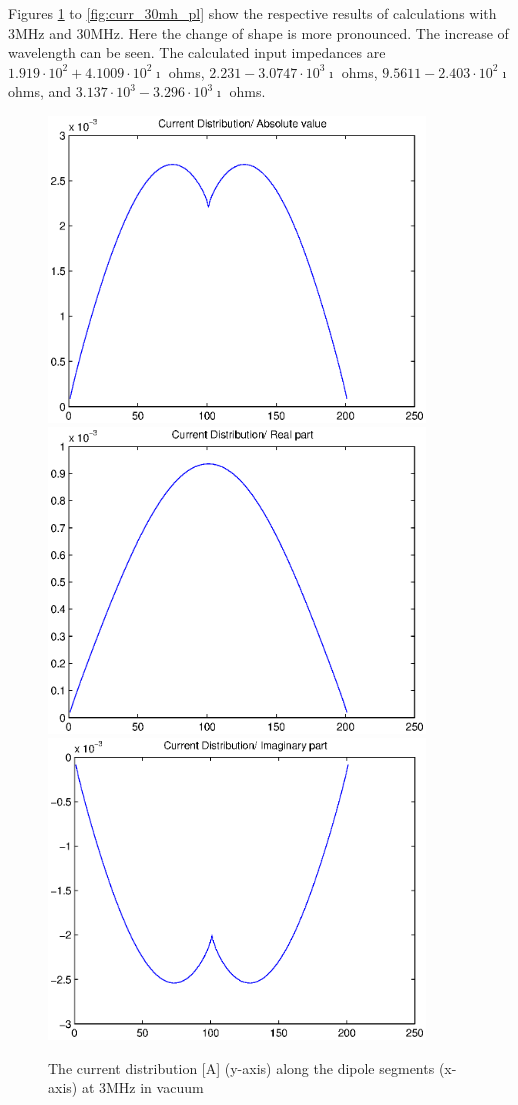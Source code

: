 \documentclass[a4paper,11pt]{thesis}
\begin{document}
Figures \ref{fig:curr_3mh_vac} to \ref{fig:curr_30mh_pl} show the respective results of calculations with 3MHz and 30MHz. Here the change of shape is more pronounced. The increase of wavelength can be seen. The calculated input impedances are $1.919\cdot 10^2 +4.1009\cdot10^2\imath$ ohms, $2.231 -3.0747\cdot10^3\imath$ ohms, $9.5611 -2.403\cdot 10^2\imath$ ohms, and
$3.137\cdot 10^3 -3.296\cdot 10^3\imath$ ohms.\\

\begin{figure}
 \begin{center}
\includegraphics[width=10.0cm]{DissPics/curr_abs_3mh.eps}
 \includegraphics[width=10.0cm]{DissPics/curr_re_3mh.eps}
 \includegraphics[width=10.0cm]{DissPics/curr_im_3mh.eps}\end{center}
  \caption{The current distribution [A] (y-axis) along the dipole segments (x-axis) at 3MHz in vacuum}\label{fig:curr_3mh_vac}
\end{figure}
\end{document}
